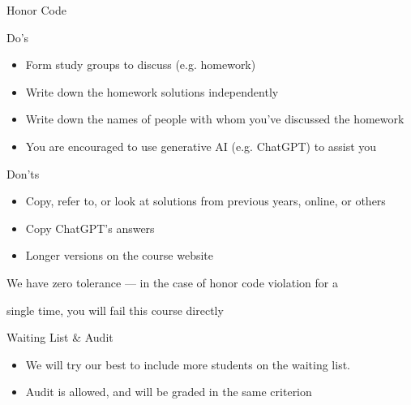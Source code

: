 \documentclass[aspectratio=169,12pt]{beamer}
\begin{document}

\begin{frame}[t]{Honor Code}
  \vspace{0.2cm}
  {\fontsize{10.8}{12.8}\selectfont
  Do's
  \begin{itemize}
    \setlength{\topsep}{0.03cm}
    \setlength{\partopsep}{0pt}
    \setlength{\parsep}{0pt}
    \setlength{\itemsep}{0.01cm}
    \item Form study groups to discuss (e.g. homework)
    \item Write down the homework solutions independently
    \item Write down the names of people with whom you've discussed the homework
    \item You are encouraged to use generative AI (e.g. ChatGPT) to assist you
  \end{itemize}

  \vspace{0.2cm}
  Don'ts
  \begin{itemize}
    \setlength{\topsep}{0.03cm}
    \setlength{\partopsep}{0pt}
    \setlength{\parsep}{0pt}
    \setlength{\itemsep}{0.01cm}
    \item Copy, refer to, or look at solutions from previous years, online, or others
    \item Copy ChatGPT's answers
    \item Longer versions on the course website
  \end{itemize}
  }

  \vspace{0.2cm}
  {\color{warningred}\fontsize{11.2}{13.3}\selectfont
    \hspace*{0.55cm}We have zero tolerance --- in the case of honor code violation for a\par
    \hspace*{0.55cm}single time, you will fail this course directly
  }
\end{frame}

\begin{frame}[t]{Waiting List \& Audit}
  \vspace{0.40cm}
  {\large
  \begin{itemize}
    \setlength{\itemsep}{0.95cm}
    \item We will try our best to include more students on the waiting list.
    \item Audit is allowed, and will be graded in the same criterion
  \end{itemize}
  }
\end{frame}
\end{document}
